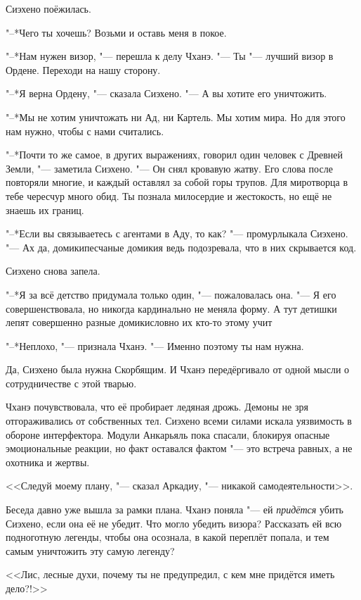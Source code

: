 Сиэхено поёжилась.

"--*Чего ты хочешь?
Возьми и оставь меня в покое.

"--*Нам нужен визор, "--- перешла к делу Чханэ.
"--- Ты "--- лучший визор в Ордене.
Переходи на нашу сторону.

"--*Я верна Ордену, "--- сказала Сиэхено.
"--- А вы хотите его уничтожить.

"--*Мы не хотим уничтожать ни Ад, ни Картель.
Мы хотим мира.
Но для этого нам нужно, чтобы с нами считались.

"--*Почти то же самое, в других выражениях, говорил один человек с Древней Земли, "--- заметила Сиэхено.
"--- Он снял кровавую жатву.
Его слова после повторяли многие, и каждый оставлял за собой горы трупов.
Для миротворца в тебе чересчур много обид.
Ты познала милосердие и жестокость, но ещё не знаешь их границ.

\spacing

"--*Если вы связываетесь с агентами в Аду, то как? "--- промурлыкала Сиэхено.
"--- Ах да, домики\ldotst песчаные домики\ldotst я ведь подозревала, что в них скрывается код.

Сиэхено снова запела.

"--*Я за всё детство придумала только один, "--- пожаловалась она.
"--- Я его совершенствовала, но никогда кардинально не меняла форму.
А тут детишки лепят совершенно разные домики\ldotst словно их кто-то этому учит\ldotst

"--*Неплохо, "--- признала Чханэ.
"--- Именно поэтому ты нам нужна.

Да, Сиэхено была нужна Скорбящим.
И Чханэ передёргивало от одной мысли о сотрудничестве с этой тварью.

\spacing

Чханэ почувствовала, что её пробирает ледяная дрожь.
Демоны не зря отгораживались от собственных тел.
Сиэхено всеми силами искала уязвимость в обороне интерфектора.
Модули Анкарьяль пока спасали, блокируя опасные эмоциональные реакции, но факт оставался фактом "--- это встреча равных, а не охотника и жертвы.

<<Следуй моему плану, "--- сказал Аркадиу, "--- никакой самодеятельности>>.

Беседа давно уже вышла за рамки плана.
Чханэ поняла "--- ей \emph{придётся} убить Сиэхено, если она её не убедит.
Что могло убедить визора?
Рассказать ей всю подноготную легенды, чтобы она осознала, в какой переплёт попала, и тем самым уничтожить эту самую легенду?

<<Лис, лесные духи, почему ты не предупредил, с кем мне придётся иметь дело?!>>

